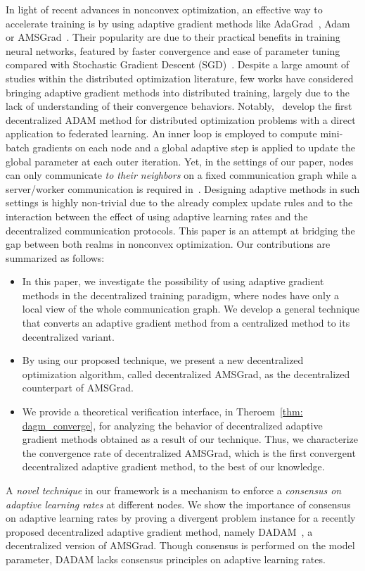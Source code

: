 \documentclass{article} %
\begin{document}
In light of recent advances in nonconvex optimization, an effective way to accelerate training is by using adaptive gradient methods like AdaGrad~\citep{duchi2011adaptive}, Adam~\citep{kingma2014adam} or AMSGrad~\citep{reddi2019convergence}. 
Their popularity are due to their practical benefits in training neural networks, featured by faster convergence and ease of parameter tuning compared with Stochastic Gradient Descent (SGD)~\citep{robbins1951stochastic}.
Despite a large amount of studies within the distributed optimization literature, few works have considered bringing adaptive gradient methods into distributed training, largely due to the lack of understanding of their convergence behaviors. 
Notably,~\citet{reddi2020adaptive} develop the first decentralized ADAM method for distributed optimization problems with a direct application to federated learning.
An inner loop is employed to compute mini-batch gradients on each node and a global adaptive step is applied to update the global parameter at each outer iteration.
Yet, in the settings of our paper, nodes can only communicate \emph{to their neighbors} on a fixed communication graph while a server/worker communication is required in~\citet{reddi2020adaptive}.
Designing adaptive methods in such settings is highly non-trivial due to the already complex update rules and to the interaction between the effect of using adaptive learning rates and the decentralized communication protocols.
This paper is an attempt at bridging the gap between both realms in nonconvex optimization. 
Our contributions are summarized as follows:
\begin{itemize}
\item In this paper, we investigate the possibility of using adaptive gradient methods in the decentralized training paradigm, where nodes have only a local view of the whole communication graph. We develop a general technique that converts an adaptive gradient method from a centralized method to its decentralized variant.
\item By using our proposed technique, we present a new decentralized optimization algorithm, called decentralized AMSGrad, as the decentralized counterpart of AMSGrad.
\item We provide a theoretical verification interface, in Theroem~\ref{thm: dagm_converge}, for analyzing the behavior of decentralized adaptive gradient methods obtained as a result of our technique.
Thus, we characterize the convergence rate of decentralized AMSGrad, which is the first convergent decentralized adaptive gradient method, to the best of our knowledge.
\end{itemize}
A \emph{novel technique} in our framework is a mechanism to enforce a \emph{consensus on adaptive learning rates} at different nodes. 
We show the importance of consensus on adaptive learning rates by proving a divergent problem instance for a recently proposed decentralized adaptive gradient method, namely DADAM~\citep{nazari2019dadam}, a decentralized version of AMSGrad. 
Though consensus is performed on the model parameter, DADAM lacks consensus principles on adaptive learning rates.
\end{document}
